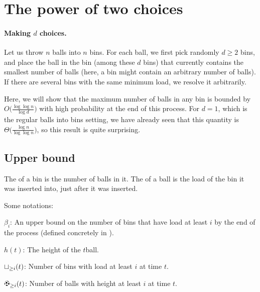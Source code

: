 \section{The power of two choices}
%

\paragraph*{Making $d$ choices.}
Let us throw $n$ balls into $n$ bins. For each ball, we first pick
randomly $d\geq 2$ bins, and place the ball in the bin (among these $d$
bins) that currently contains the smallest number of balls (here, a bin
might contain an arbitrary number of balls). If there are several bins
with the same minimum load, we resolve it arbitrarily.

Here, we will show that the maximum number of balls in any bin is bounded
by $O\bigl( \tfrac{\log \log n}{\log d} \bigr)$ with high probability at
the end of this process. For $d=1$, which is the regular balls into bins
setting, we have already seen that this quantity is
$\Theta\bigl( \tfrac{\log n}{ \log \log n}\bigr)$, so this result is quite
surprising.



\subsection{Upper bound}

\begin{defn}
    The  of a bin is the number of balls in it. The
     of a ball is the load of the bin it was inserted
    into, just after it was inserted.
\end{defn}


Some notations:
\begin{compactenumA}
    \smallskip%
    \item $\beta_i$: An upper bound on the number of bins that have load at
    least $i$ by the end of the process (defined concretely in
    ).
    
    \smallskip%
    \item $h(t)$: The height of the $t$\th ball.

    \smallskip%
    \item $\binsY{i}{t}$: Number of bins with load at least $i$ at
    time $t$.

    \smallskip%
    \item $\ballsY{i}{t}$: Number of balls with height at least $i$ at
    time $t$.
\end{compactenumA}

